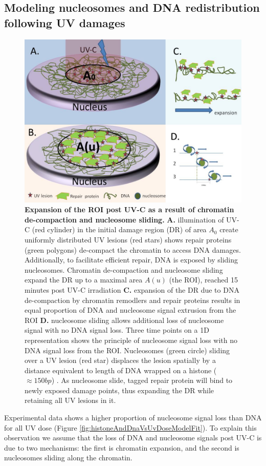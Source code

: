 \documentclass[12pt]{article}
\begin{document}
	\subsection{Modeling nucleosomes and DNA redistribution following UV damages}
		\begin{figure}[H]
			\centering
			\includegraphics[width=0.7\linewidth, height=0.4\textheight]{ExperimentalProcedure}
			\caption{\small{\textbf{Expansion of the ROI post UV-C as a result of chromatin de-compaction and nucleosome sliding.} \textbf{A.} illumination of UV-C (red cylinder) in the initial damage region (DR) of area $A_0$ create uniformly distributed UV lesions (red stars) shows repair proteins (green polygons) de-compact the chromatin to access DNA damages. Additionally, to facilitate efficient repair, DNA is exposed by sliding nucleosomes. Chromatin de-compaction and nucleosome sliding expand the DR up to a maximal area $A(u)$ (the ROI), reached 15 minutes post UV-C irradiation \textbf{C.} expansion of the DR due to DNA de-compaction by chromatin remodlers and repair proteins results in equal proportion of DNA and nucleosome signal extrusion from the ROI \textbf{D.} nucleosome sliding allows additional loss of nucleosome signal with no DNA signal loss. Three time points on a 1D representation shows the principle of nucleosome signal loss with no DNA signal loss from the ROI. Nucleosomes (green circle) sliding over a UV lesion (red star) displaces the lesion spatially by a distance equivalent to length of DNA wrapped on a histone ($\approx150 bp$) }. As nucleosome slide, tagged repair protein will bind to newly exposed damage points, thus expanding the DR while retaining all UV lesions in it.}
			\label{fig:ExperimentalProcedure}
		\end{figure}
		
	Experimental data shows a higher proportion of nucleosome signal loss than DNA for all UV dose (Figure \ref{fig:histoneAndDnaVsUvDoseModelFit}). To explain this observation we assume that the loss of DNA and nucleosome signals post UV-C is due to two mechanisms: the first is chromatin expansion, and the second is nucleosomes sliding along the chromatin. 
	
\end{document}
